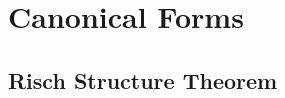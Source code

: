 \chapter{Canonical Forms}
\label{canonical:Chap}

\section{Risch Structure Theorem}
\label{Risch:Struct:Sec}



